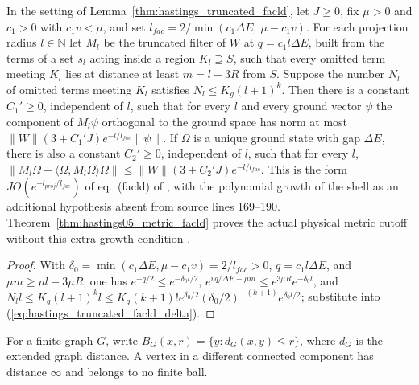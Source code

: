 \begin{lemma}
    \label{thm:hastings_truncated_facld_decay}
    \leanok
    In the setting of Lemma~\ref{thm:hastings_truncated_facld}, let $J\ge0$,
    fix $\mu>0$ and $c_1>0$ with $c_1v<\mu$, and set
    $l_{fac}=2/\min(c_1\Delta E,\ \mu-c_1v)$. For each projection radius
    $l\in\mathbb{N}$ let $M_l$ be the truncated filter of $W$ at
    $q=c_1l\Delta E$, built from the terms of a set $s_l$ acting inside a
    region $K_l\supseteq S$, such that every omitted term meeting $K_l$ lies at
    distance at least $m=l-3R$ from $S$. Suppose the number $N_l$ of omitted
    terms meeting $K_l$ satisfies $N_l\le K_g(l+1)^k$. Then there is a constant
    $C_1'\ge0$, independent of $l$, such that for every $l$ and every ground
    vector $\psi$ the component of $M_l\psi$ orthogonal to the ground space
    has norm at most $\|W\|(3+C_1'J)e^{-l/l_{fac}}\|\psi\|$.
    If $\Omega$ is a unique ground state with gap $\Delta E$, there is also a
    constant $C_2'\ge0$, independent of $l$, such that for every $l$,
    $\|M_l\Omega-\langle\Omega,M_l\Omega\rangle\Omega\|\le
        \|W\|(3+C_2'J)e^{-l/l_{fac}}$. This is the form $JO(e^{-l_{proj}/l_{fac}})$
    of eq.~(facld) of \cite[lines 322--349]{Hastings2006Solving}, with the
    polynomial growth of the shell as an additional hypothesis absent from
    source lines 169--190. Theorem~\ref{thm:hastings05_metric_facld} proves
    the actual physical metric cutoff without this extra growth condition
    \cite{gap:hastings05_truncated_dynamics,gap:hastings05_geometric_growth_scope}.
\end{lemma}
\begin{proof}
    \leanok
    With $\delta_0=\min(c_1\Delta E,\mu-c_1v)=2/l_{fac}>0$, $q=c_1l\Delta E$, and
    $\mu m\ge\mu l-3\mu R$, one has $e^{-q/2}\le e^{-\delta_0l/2}$,
    $e^{vq/\Delta E-\mu m}\le e^{3\mu R}e^{-\delta_0l}$, and
    $N_ll\le K_g(l+1)^kl\le K_g(k+1)!e^{\delta_0/2}(\delta_0/2)^{-(k+1)}e^{\delta_0l/2}$;
    substitute into (\ref{eq:hastings_truncated_facld_delta}).
\end{proof}

\begin{definition}
    \label{def:hastings05_graph_closed_ball}
    \leanok
    For a finite graph $G$, write $B_G(x,r)=\{y:d_G(x,y)\le r\}$,
    where $d_G$ is the extended graph distance. A vertex in a different
    connected component has distance $\infty$ and belongs to no finite ball.
\end{definition}

